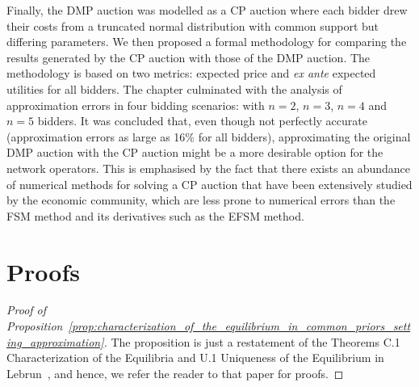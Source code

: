 Finally, the DMP auction was modelled as a CP auction where each bidder drew their costs from a truncated normal distribution with common support but differing parameters. We then proposed a formal methodology for comparing the results generated by the CP auction with those of the DMP auction. The methodology is based on two metrics: expected price and \emph{ex ante} expected utilities for all bidders. The chapter culminated with the analysis of approximation errors in four bidding scenarios: with $n=2$, $n=3$, $n=4$ and $n=5$ bidders. It was concluded that, even though not perfectly accurate (approximation errors as large as 16\% for all bidders), approximating the original DMP auction with the CP auction might be a more desirable option for the network operators. This is emphasised by the fact that there exists an abundance of numerical methods for solving a CP auction that have been extensively studied by the economic community, which are less prone to numerical errors than the FSM method and its derivatives such as the EFSM method.

\section{Proofs} %
\label{sec:proofs_approximation}
\begin{proof}[Proof of Proposition~\ref{prop:characterization_of_the_equilibrium_in_common_priors_setting_approximation}]
The proposition is just a restatement of the Theorems C.1 Characterization of the Equilibria and U.1 Uniqueness of the Equilibrium in Lebrun~\cite{Lebrun2006}, and hence, we refer the reader to that paper for proofs.
\end{proof}
